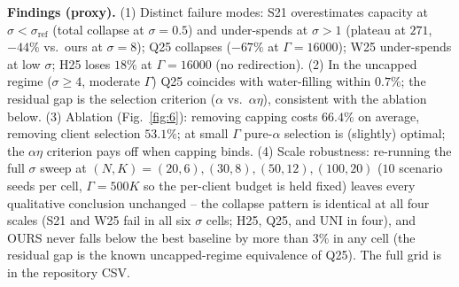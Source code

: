 \documentclass[final,1p,times]{elsarticle}
\begin{document}
\textbf{Findings (proxy).}
(1) Distinct failure modes: S21 overestimates capacity at
$\sigma<\sigma_{\mathrm{ref}}$ (total collapse at $\sigma{=}0.5$) and
under-spends at $\sigma>1$ (plateau at $271$, $-44\%$ vs.\ ours at
$\sigma{=}8$); Q25 collapses ($-67\%$ at $\Gamma{=}16000$);
W25 under-spends at low $\sigma$; H25 loses $18\%$ at
$\Gamma{=}16000$ (no redirection).
(2) In the uncapped regime ($\sigma\ge4$, moderate $\Gamma$) Q25
coincides with water-filling within $0.7\%$; the residual gap is
the selection criterion ($\alpha$ vs.\ $\alpha\eta$), consistent with
the ablation below.
(3) Ablation (Fig.~\ref{fig:6}): removing capping costs $66.4\%$ on average,
removing client selection $53.1\%$; at small $\Gamma$ pure-$\alpha$
selection is (slightly) optimal; the $\alpha\eta$ criterion pays
off when capping binds.
(4) Scale robustness: re-running the full $\sigma$ sweep at
$(N,K){=}(20,6),(30,8),(50,12),(100,20)$ ($10$ scenario seeds per cell,
$\Gamma{=}500K$ so the per-client budget is held fixed) leaves every
qualitative conclusion unchanged -- the collapse pattern is identical at
all four scales (S21 and W25 fail in all six $\sigma$ cells; H25, Q25,
and UNI in four), and OURS never falls below the best baseline by more
than $3\%$ in any cell (the residual gap is the known uncapped-regime
equivalence of Q25). The full grid is in the repository CSV.
\end{document}
